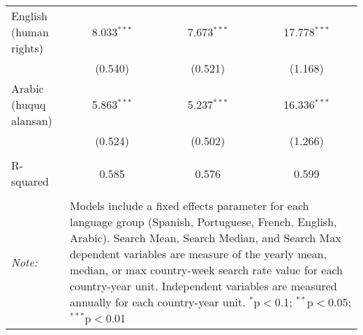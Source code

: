 \begin{table}[!htbp]
\begin{tabular}{@{\extracolsep{5pt}}lccc}
  English (human rights) & 8.033$^{***}$ & 7.673$^{***}$ & 17.778$^{***}$ \\ 
  & (0.540) & (0.521) & (1.168) \\ 
  Arabic (huquq alansan) & 5.863$^{***}$ & 5.237$^{***}$ & 16.336$^{***}$ \\ 
  & (0.524) & (0.502) & (1.266) \\ 
 \hline \\[-1.8ex] 
R-squared  & 0.585 & 0.576 & 0.599 \\ 
\hline 
\hline \\[-1.8ex] 
\textit{Note:}  & \multicolumn{3}{l}{\parbox[t]{8cm}{Models include a fixed effects parameter for each language group (Spanish, Portuguese, French, English, Arabic). Search Mean, Search Median, and Search Max dependent variables are measure of the yearly mean, median, or max country-week search rate value for each country-year unit. Independent variables are measured annually for each country-year unit. $^{*}$p$<$0.1; $^{**}$p$<$0.05; $^{***}$p$<$0.01}} \\ 
\end{tabular} 
\end{table} 
